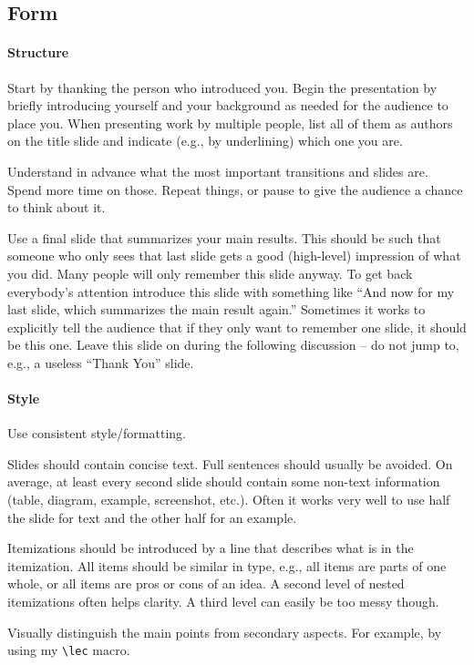\documentclass[12pt]{article}
\begin{document}
\subsection{Form}

\paragraph{Structure}
Start by thanking the person who introduced you.
Begin the presentation by briefly introducing yourself and your background as needed for the audience to place you.
When presenting work by multiple people, list all of them as authors on the title slide and indicate (e.g., by underlining) which one you are.
\medskip

Understand in advance what the most important transitions and slides are.
Spend more time on those.
Repeat things, or pause to give the audience a chance to think about it.
\medskip

Use a final slide that summarizes your main results.
This should be such that someone who only sees that last slide gets a good (high-level) impression of what you did.
Many people will only remember this slide anyway.
To get back everybody's attention introduce this slide with something like ``And now for my last slide, which summarizes the main result again.''
Sometimes it works to explicitly tell the audience that if they only want to remember one slide, it should be this one.
Leave this slide on during the following discussion -- do not jump to, e.g., a useless ``Thank You'' slide.

\paragraph{Style}
Use consistent style/formatting.
\medskip

Slides should contain concise text.
Full sentences should usually be avoided.
On average, at least every second slide should contain some non-text information (table, diagram, example, screenshot, etc.).
Often it works very well to use half the slide for text and the other half for an example.
\medskip

Itemizations should be introduced by a line that describes what is in the itemization.
All items should be similar in type, e.g., all items are parts of one whole, or all items are pros or cons of an idea.
A second level of nested itemizations often helps clarity.
A third level can easily be too messy though.
\medskip

Visually distinguish the main points from secondary aspects. For example, by using my \verb|\lec| macro.
\medskip
\end{document}
